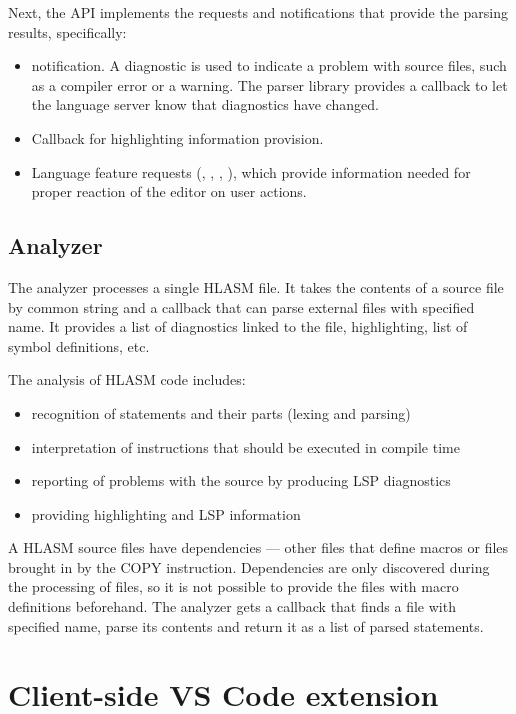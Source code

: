 Next, the API implements the requests and notifications that provide the parsing results, specifically:
\begin{itemize}
	\item {} notification. A diagnostic is used to indicate a problem with source files, such as a compiler error or a warning. The parser library provides a callback to let the language server know that diagnostics have changed.
	\item Callback for highlighting information provision.
	\item Language feature requests (, , , ), which provide information needed for proper reaction of the editor on user actions.
\end{itemize}

\subsection{Analyzer}

The analyzer processes a single HLASM file. It takes the contents of a source file by common string and a callback that can parse external files with specified name. It provides a list of diagnostics linked to the file, highlighting, list of symbol definitions, etc.

The analysis of HLASM code includes:
\begin{itemize}
 \item recognition of statements and their parts (lexing and parsing)
 \item interpretation of instructions that should be executed in compile time
 \item reporting of problems with the source by producing LSP diagnostics
 \item providing highlighting and LSP information
\end{itemize}

A HLASM source files have dependencies --- other files that define macros or files brought in by the COPY instruction. Dependencies are only discovered during the processing of files, so it is not possible to provide the files with macro definitions beforehand. The analyzer gets a callback that finds a file with specified name, parse its contents and return it as a list of parsed statements. 

\section{Client-side VS Code extension}
\label{arch:client}

